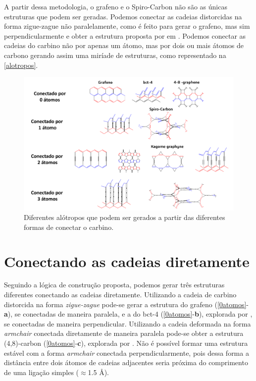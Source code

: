 	A partir dessa metodologia, o grafeno e o Spiro-Carbon não são as únicas estruturas que podem ser geradas. Podemos conectar as cadeias distorcidas na forma zigue-zague não paralelamente, como é feito para gerar o grafeno, mas sim perpendicularmente e obter a estrutura proposta por \citeauthor{hoffmann1983hypothetical} em \citeyear{hoffmann1983hypothetical}. Podemos conectar as cadeias do carbino não por apenas um átomo, mas por dois ou mais átomos de carbono gerando assim uma miríade de estruturas, como representado na \autoref{alotropos}. 
	
	\begin{figure}[!ht]
		\centering
		\includegraphics[width=1.\linewidth]{capitulos/fig/results3/alotropos}
		\caption{Diferentes alótropos que podem ser gerados a partir das diferentes formas de conectar o carbino.}
		\label{alotropos}
	\end{figure}

	\section{Conectando as cadeias diretamente}
		
		Seguindo a lógica de construção proposta, podemos gerar três estruturas diferentes conectando as cadeias diretamente. Utilizando a cadeia de carbino distorcida na forma \textit{zigue-zague} pode-se gerar a estrutura do grafeno (\autoref{0atomos}-\textbf{a}), se conectadas de maneira paralela, e a do bct-4 (\autoref{0atomos}-\textbf{b}), explorada por \citeauthor{hoffmann1983hypothetical}, se conectadas de maneira perpendicular. Utilizando a cadeia deformada na forma \textit{armchair} conectada diretamente de maneira paralela pode-se obter a estrutura (4,8)-carbon (\autoref{0atomos}-\textbf{c}), explorada por \citeauthor{nisar2012semiconducting}. Não é possível formar uma estrutura estável com a forma \textit{armchair} conectada perpendicularmente, pois dessa forma a distância entre dois átomos de cadeias adjacentes seria próxima do comprimento de uma ligação simples ($\approx$1.5 \AA{}). 
		
